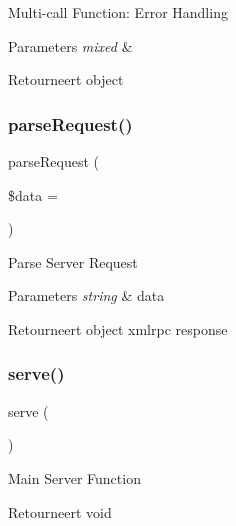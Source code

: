 Multi-\/call Function\+: Error Handling


\begin{DoxyParams}{Parameters}
{\em mixed} & \\
\hline
\end{DoxyParams}
\begin{DoxyReturn}{Retourneert}
object 
\end{DoxyReturn}
\mbox{\label{class_c_i___xmlrpcs_a8a0c34554b9238be766ab85f55519b6e}} 
\subsubsection{\texorpdfstring{parseRequest()}{parseRequest()}}
{\footnotesize\ttfamily parse\+Request (\begin{DoxyParamCaption}\item[{}]{\$data = {\ttfamily \textquotesingle{}\textquotesingle{}} }\end{DoxyParamCaption})}

Parse Server Request


\begin{DoxyParams}{Parameters}
{\em string} & data \\
\hline
\end{DoxyParams}
\begin{DoxyReturn}{Retourneert}
object xmlrpc response 
\end{DoxyReturn}
\mbox{\label{class_c_i___xmlrpcs_aa9e0b443b9575f62bf9f8e85b1742c96}} 
\subsubsection{\texorpdfstring{serve()}{serve()}}
{\footnotesize\ttfamily serve (\begin{DoxyParamCaption}{ }\end{DoxyParamCaption})}

Main Server Function

\begin{DoxyReturn}{Retourneert}
void 
\end{DoxyReturn}
\mbox{\label{class_c_i___xmlrpcs_a858a05529612358b8f63c88b08b414d0}} 
